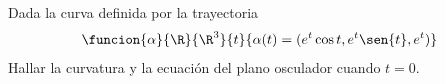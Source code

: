 \documentclass[a4,11pt]{aleph-examen}
\begin{document}
\begin{preguntas}

\item 
    Dada la curva definida por la trayectoria
    \[
        \funcion{\alpha}{\R}{\R^3}
        {t}{\alpha(t) = (e^{t}\cos{t}, e^{t}\sen{t}, e^{t})}
	\]
    Hallar la curvatura y la ecuación del plano osculador cuando $t = 0$.
        

\end{preguntas}
\end{document}
